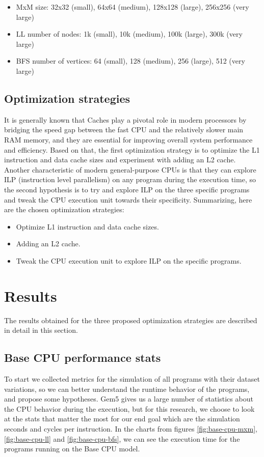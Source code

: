 \documentclass[
	article,			%
	11pt,				%
	oneside,			%
	a4paper,			%
	brazil,				%
        english,			%
	sumario=tradicional
	]{abntex2}
\begin{document}
\begin{itemize}
    \item MxM size: 32x32 (small), 64x64 (medium), 128x128 (large),  256x256 (very large)
    \item LL number of nodes: 1k (small), 10k (medium), 100k (large), 300k (very large)
    \item BFS number of vertices: 64 (small), 128 (medium), 256 (large), 512 (very large)
\end{itemize}

\subsection{Optimization strategies}
It is generally known that Caches play a pivotal role in modern processors by bridging the speed gap between the fast CPU and the relatively slower main RAM memory, and they are essential for improving overall system performance and efficiency. Based on that, the first optimization strategy is to optimize the L1 instruction and data cache sizes and experiment with adding an L2 cache. Another characteristic of modern general-purpose CPUs is that they can explore ILP (instruction level parallelism) on any program during the execution time, so the second hypothesis is to try and explore ILP on the three specific programs and tweak the CPU execution unit towards their specificity. Summarizing, here are the chosen optimization strategies:
\begin{itemize}
    \item Optimize L1 instruction and data cache sizes.
    \item Adding an L2 cache.
    \item Tweak the CPU execution unit to explore ILP on the specific programs.
\end{itemize}

\section{Results}
The results obtained for the three proposed optimization strategies are described in detail in this section.

\subsection{Base CPU performance stats}
To start we collected metrics for the simulation of all programs with their dataset variations, so we can better understand the runtime behavior of the programs, and propose some hypotheses. Gem5 gives us a large number of statistics about the CPU behavior during the execution, but for this research, we choose to look at the stats that matter the most for our end goal which are the simulation seconds and cycles per instruction. In the charts from figures \ref{fig:base-cpu-mxm}, \ref{fig:base-cpu-ll} and \ref{fig:base-cpu-bfs}, we can see the execution time for the programs running on the Base CPU model.
\end{document}
